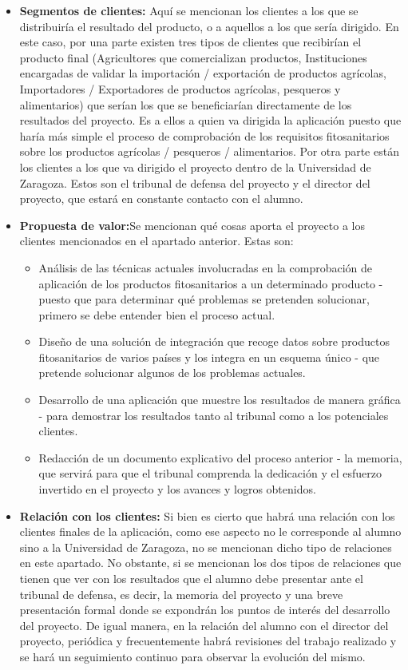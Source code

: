 \begin{itemize}
\item \textbf{Segmentos de clientes:} Aquí se mencionan los clientes a los que se distribuiría el resultado del producto, o a aquellos a los que sería dirigido. En este caso, por una parte existen tres tipos de clientes que recibirían el producto final (Agricultores que comercializan productos, Instituciones encargadas de validar la importación / exportación  de productos agrícolas, Importadores / Exportadores de productos agrícolas, pesqueros y alimentarios) que serían los que se beneficiarían directamente de los resultados del proyecto. Es a ellos a quien va dirigida la aplicación puesto que haría más simple el proceso de comprobación de los requisitos fitosanitarios sobre los productos agrícolas / pesqueros / alimentarios. Por otra parte están los clientes a los que va dirigido el proyecto dentro de la Universidad de Zaragoza. Estos son el tribunal de defensa del proyecto y el director del proyecto, que estará en constante contacto con el alumno. 
\item \textbf{Propuesta de valor:}Se mencionan qué cosas aporta el proyecto a los clientes mencionados en el apartado anterior. Estas son:
\begin{itemize}
\item Análisis de las técnicas actuales involucradas en la comprobación de aplicación de los productos fitosanitarios a un determinado producto - puesto que para determinar qué problemas se pretenden solucionar, primero se debe entender bien el proceso actual.
\item Diseño de una solución de integración que recoge datos sobre productos fitosanitarios de varios países y los integra en un esquema único - que pretende solucionar algunos de los problemas actuales.
\item Desarrollo de una aplicación que muestre los resultados de manera gráfica - para demostrar los resultados tanto al tribunal como a los potenciales clientes.
\item Redacción de un documento explicativo del proceso anterior - la memoria, que servirá para que el tribunal comprenda la dedicación y el esfuerzo invertido en el proyecto y los avances y logros obtenidos.
\end{itemize}
\item \textbf{Relación con los clientes:} Si bien es cierto que habrá una relación con los clientes finales de la aplicación, como ese aspecto no le corresponde al alumno sino a la Universidad de Zaragoza, no se mencionan dicho tipo de relaciones en este apartado. No obstante, si se mencionan los dos tipos de relaciones que tienen que ver con los resultados que el alumno debe presentar ante el tribunal de defensa, es decir, la memoria del proyecto y una breve presentación formal donde se expondrán los puntos de interés del desarrollo del proyecto. De igual manera, en la relación del alumno con el director del proyecto, periódica y frecuentemente habrá revisiones del trabajo realizado y se hará un seguimiento continuo para observar la evolución del mismo.

\end{itemize}
